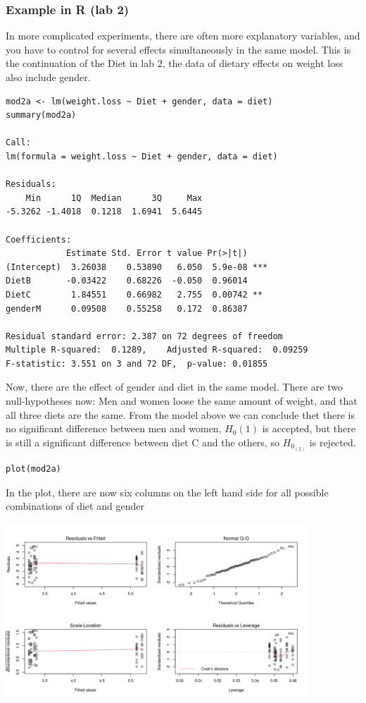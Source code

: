 \documentclass{article}
\begin{document}
\subsubsection{Example in R (lab 2)}
In more complicated experiments, there are often more explanatory variables, and you have to control for several effects simultaneously in the same model. This is the continuation of the Diet in lab 2, the data of dietary effects on weight loss also include gender.\par

\begin{lstlisting}
mod2a <- lm(weight.loss ~ Diet + gender, data = diet)
summary(mod2a)

Call:
lm(formula = weight.loss ~ Diet + gender, data = diet)

Residuals:
    Min      1Q  Median      3Q     Max 
-5.3262 -1.4018  0.1218  1.6941  5.6445 

Coefficients:
            Estimate Std. Error t value Pr(>|t|)    
(Intercept)  3.26038    0.53890   6.050  5.9e-08 ***
DietB       -0.03422    0.68226  -0.050  0.96014    
DietC        1.84551    0.66982   2.755  0.00742 ** 
genderM      0.09508    0.55258   0.172  0.86387    

Residual standard error: 2.387 on 72 degrees of freedom
Multiple R-squared:  0.1289,	Adjusted R-squared:  0.09259 
F-statistic: 3.551 on 3 and 72 DF,  p-value: 0.01855
\end{lstlisting}
Now, there are the effect of gender and diet in the same model. There are two null-hypotheses now: Men and women loose the same amount of weight, and that all three diets are the same. From the model above we can conclude thet there is no significant difference between men and women, $H_0(1)$ is accepted, but there is still a significant difference between diet C and the others, so $H_0_(2)$ is rejected.\par
\begin{lstlisting}
plot(mod2a)
\end{lstlisting}
In the plot, there are now six columns on the left hand side for all possible combinations of diet and gender
\begin{center}
\includegraphics[width = 0.85\textwidth]{lab3/lm_1.png}
\end{center}
\end{document}
